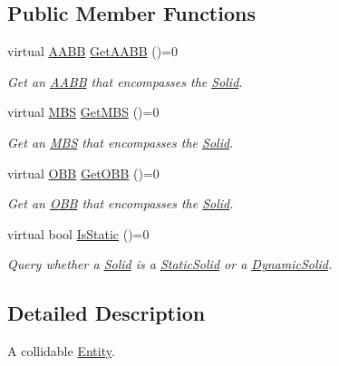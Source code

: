 \subsection*{Public Member Functions}
\begin{DoxyCompactItemize}
\item 
virtual \hyperlink{class_f_l_i_g_h_t_1_1_a_a_b_b}{A\+A\+BB} \hyperlink{class_f_l_i_g_h_t_1_1_solid_ae5db89380caf480ae8f5b203dab13e5b}{Get\+A\+A\+BB} ()=0
\begin{DoxyCompactList}\small\item\em Get an \hyperlink{class_f_l_i_g_h_t_1_1_a_a_b_b}{A\+A\+BB} that encompasses the \hyperlink{class_f_l_i_g_h_t_1_1_solid}{Solid}. \end{DoxyCompactList}\item 
virtual \hyperlink{class_f_l_i_g_h_t_1_1_m_b_s}{M\+BS} \hyperlink{class_f_l_i_g_h_t_1_1_solid_ad96c0c336a3d32fcd4dee3c35043c862}{Get\+M\+BS} ()=0
\begin{DoxyCompactList}\small\item\em Get an \hyperlink{class_f_l_i_g_h_t_1_1_m_b_s}{M\+BS} that encompasses the \hyperlink{class_f_l_i_g_h_t_1_1_solid}{Solid}. \end{DoxyCompactList}\item 
virtual \hyperlink{class_f_l_i_g_h_t_1_1_o_b_b}{O\+BB} \hyperlink{class_f_l_i_g_h_t_1_1_solid_a8234bad63b8aff2f613407d80eee4bef}{Get\+O\+BB} ()=0
\begin{DoxyCompactList}\small\item\em Get an \hyperlink{class_f_l_i_g_h_t_1_1_o_b_b}{O\+BB} that encompasses the \hyperlink{class_f_l_i_g_h_t_1_1_solid}{Solid}. \end{DoxyCompactList}\item 
virtual bool \hyperlink{class_f_l_i_g_h_t_1_1_solid_afcaa25bff89717d44a822723682a63f8}{Is\+Static} ()=0
\begin{DoxyCompactList}\small\item\em Query whether a \hyperlink{class_f_l_i_g_h_t_1_1_solid}{Solid} is a \hyperlink{class_f_l_i_g_h_t_1_1_static_solid}{Static\+Solid} or a \hyperlink{class_f_l_i_g_h_t_1_1_dynamic_solid}{Dynamic\+Solid}. \end{DoxyCompactList}\end{DoxyCompactItemize}


\subsection{Detailed Description}
A collidable \hyperlink{class_f_l_i_g_h_t_1_1_entity}{Entity}. 

